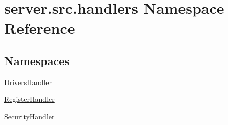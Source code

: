 \hypertarget{namespaceserver_1_1src_1_1handlers}{}\section{server.\+src.\+handlers Namespace Reference}
\label{namespaceserver_1_1src_1_1handlers}
\subsection*{Namespaces}
\begin{DoxyCompactItemize}
\item 
 \hyperlink{namespaceserver_1_1src_1_1handlers_1_1_drivers_handler}{Drivers\+Handler}
\item 
 \hyperlink{namespaceserver_1_1src_1_1handlers_1_1_register_handler}{Register\+Handler}
\item 
 \hyperlink{namespaceserver_1_1src_1_1handlers_1_1_security_handler}{Security\+Handler}
\end{DoxyCompactItemize}
